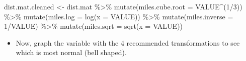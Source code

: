 \documentclass[
  letterpaper,
  DIV=11,
  numbers=noendperiod]{scrreprt}
\newenvironment{Shaded}{\begin{snugshade}}{\end{snugshade}}
\newcommand{\AttributeTok}[1]{\textcolor[rgb]{0.40,0.45,0.13}{#1}}
\newcommand{\DecValTok}[1]{\textcolor[rgb]{0.68,0.00,0.00}{#1}}
\newcommand{\FunctionTok}[1]{\textcolor[rgb]{0.28,0.35,0.67}{#1}}
\newcommand{\NormalTok}[1]{\textcolor[rgb]{0.00,0.23,0.31}{#1}}
\newcommand{\OtherTok}[1]{\textcolor[rgb]{0.00,0.23,0.31}{#1}}
\newcommand{\SpecialCharTok}[1]{\textcolor[rgb]{0.37,0.37,0.37}{#1}}
\providecommand{\tightlist}{%
  \setlength{\itemsep}{0pt}\setlength{\parskip}{0pt}}\usepackage{longtable,booktabs,array}
\begin{document}
\begin{Shaded}
\begin{Highlighting}[]
\NormalTok{dist.mat.cleaned }\OtherTok{\textless{}{-}}\NormalTok{ dist.mat }\SpecialCharTok{\%\textgreater{}\%}
    \FunctionTok{mutate}\NormalTok{(}\AttributeTok{miles.cube.root =}\NormalTok{ VALUE}\SpecialCharTok{\^{}}\NormalTok{(}\DecValTok{1}\SpecialCharTok{/}\DecValTok{3}\NormalTok{)) }\SpecialCharTok{\%\textgreater{}\%}
    \FunctionTok{mutate}\NormalTok{(}\AttributeTok{miles.log =} \FunctionTok{log}\NormalTok{(}\AttributeTok{x =}\NormalTok{ VALUE)) }\SpecialCharTok{\%\textgreater{}\%}
    \FunctionTok{mutate}\NormalTok{(}\AttributeTok{miles.inverse =} \DecValTok{1}\SpecialCharTok{/}\NormalTok{VALUE) }\SpecialCharTok{\%\textgreater{}\%}
    \FunctionTok{mutate}\NormalTok{(}\AttributeTok{miles.sqrt =} \FunctionTok{sqrt}\NormalTok{(}\AttributeTok{x =}\NormalTok{ VALUE))}
\end{Highlighting}
\end{Shaded}

\begin{itemize}
\tightlist
\item
  Now, graph the variable with the 4 recommended transformations to see
  which is most normal (bell shaped).
\end{itemize}
\end{document}
